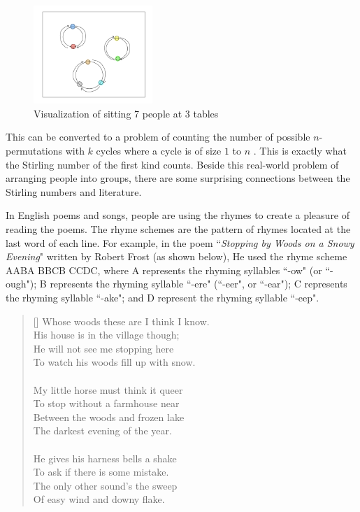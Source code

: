 \documentclass{article}
\theoremstyle{definition}
\theoremstyle{remark}
\theoremstyle{example}
\newcommand{\attrib}[1]{%
\nopagebreak{\raggedleft\footnotesize #1\par}}
\begin{document}
\begin{figure}[H]
\centering
\includegraphics[width=0.4\textwidth]{Visualization0.jpg}
\caption{\label{vis:V0}Visualization of sitting 7 people at 3 tables}
\end{figure}

This can be converted to a problem of counting the number of possible $n$-permutations with $k$ cycles where a cycle is of size $1$ to $n$ \cite{bona_combinatorics_2012}. This is exactly what the Stirling number of the first kind counts. Beside this real-world problem of arranging people into groups, there are some surprising connections between the Stirling numbers and literature.

In English poems and songs, people are using the rhymes to create a pleasure of reading the poems. The rhyme schemes are the pattern of rhymes located at the last word of each line. For example, in the poem ``\textit{Stopping by Woods on a Snowy Evening}" written by Robert Frost (as shown below), He used the rhyme scheme AABA BBCB CCDC, where A represents the rhyming syllables ``-ow" (or ``-ough"); B represents the rhyming syllable ``-ere" (``-eer", or ``-ear"); C represents the rhyming syllable ``-ake"; and D represent the rhyming syllable ``-eep".

\settowidth{\versewidth}{His house is in the village though;}
\begin{verse}[\versewidth]
Whose woods these are I think I know.\\
His house is in the village though;\\
He will not see me stopping here\\
To watch his woods fill up with snow.\\
\\
My little horse must think it queer\\
To stop without a farmhouse near\\
Between the woods and frozen lake\\
The darkest evening of the year.\\
\\
He gives his harness bells a shake\\
To ask if there is some mistake.\\
The only other sound’s the sweep\\
Of easy wind and downy flake.
\end{verse}
\attrib{Robert Frost (1874--1963)}
\end{document}
